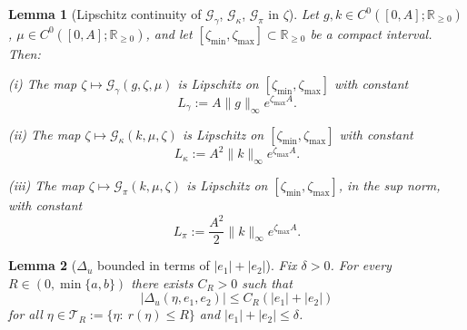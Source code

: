 \documentclass[10pt,a4paper]{amsart}
\newtheorem{lemma}{Lemma}
\begin{document}
\begin{lemma}[Lipschitz continuity of $\mathcal{G}_\gamma$, $\mathcal{G}_\kappa$, $\mathcal{G}_\pi$ in $\zeta$]
\label{lem-Lip-other}
Let $g, k \in C^0([0,A];\mathbb{R}_{\geq 0})$, $\mu \in C^0([0,A];\mathbb{R}_{\geq 0})$, and let $[\zeta_{\min},\zeta_{\max}] \subset \mathbb{R}_{\geq 0}$ be a compact interval. Then:

\smallskip
\noindent\textit{(i)} The map $\zeta \mapsto \mathcal{G}_\gamma(g,\zeta,\mu)$ is Lipschitz on $[\zeta_{\min},\zeta_{\max}]$ with constant
\begin{equation}
L_\gamma := A\|g\|_\infty e^{\zeta_{\max} A}.
\end{equation}

\noindent\textit{(ii)} The map $\zeta \mapsto \mathcal{G}_\kappa(k,\mu,\zeta)$ is Lipschitz on $[\zeta_{\min},\zeta_{\max}]$ with constant
\begin{equation}
L_\kappa := A^2\|k\|_\infty e^{\zeta_{\max} A}.
\end{equation}

\noindent\textit{(iii)} The map $\zeta \mapsto \mathcal{G}_\pi(k,\mu,\zeta)$ is Lipschitz on $[\zeta_{\min},\zeta_{\max}]$, in the sup norm, with constant
\begin{equation}
L_\pi := \frac{A^2}{2}\|k\|_\infty e^{\zeta_{\max} A}.
\end{equation}
\end{lemma}

\begin{lemma}[$\Delta_u$ bounded in terms of $|e_1|+|e_2|$]
\label{lem-Delta_u}
Fix $\delta>0$. For every $R\in(0,\min\{a,b\})$ there exists $C_{R}>0$ such that
\begin{equation}
|\Delta_u(\eta,e_1,e_2)|\le C_{R}(|e_1|+|e_2|)
\end{equation}
for all $\eta\in\mathcal T_{R}:=\{\eta:\ r(\eta)\le R\}$ and $ |e_1|+|e_2|\le\delta$.
\end{lemma}
\end{document}

